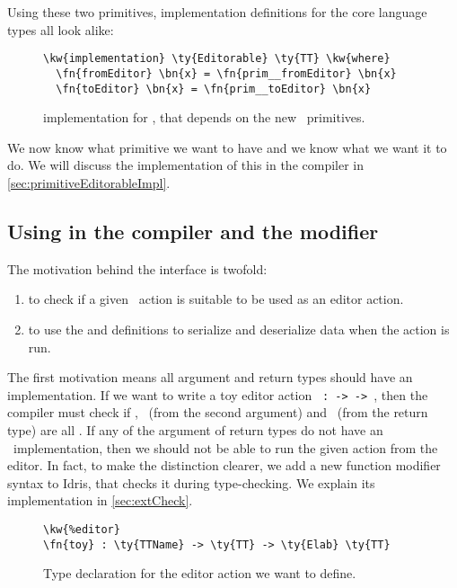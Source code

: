 Using these two primitives,  implementation definitions for the
core language types all look alike:

\begin{figure}[ht]
\caption{ implementation for \TT, that depends on the new \Elab\ primitives.}
\begin{Verbatim}[framesep=2mm, label=\footnotesize{\normalfont{Idris}}, labelposition=topline]
\kw{implementation} \ty{Editorable} \ty{TT} \kw{where}
  \fn{fromEditor} \bn{x} = \fn{prim__fromEditor} \bn{x}
  \fn{toEditor} \bn{x} = \fn{prim__toEditor} \bn{x}
\end{Verbatim}
\end{figure}

We now know what primitive we want to have and we know what we want it to do.
We will discuss the implementation of this in the compiler in
\autoref{sec:primitiveEditorableImpl}.

\subsection{Using  in the compiler and the  modifier}\label{ssec:usingEditorable}

The motivation behind the  interface is twofold:
\begin{enumerate}
\item to check if a given \Elab\ action is suitable to be used as an editor
  action.
\item to use the  and  definitions to serialize
  and deserialize data when the action is run.
\end{enumerate}

The first motivation means all argument and return types should have an
 implementation. If we want to write a toy editor action
\texttt{ :  ->  ->  },
then the compiler must check if , \TT\ (from the second argument)
and \TT\ (from the return type) are all \Editorable. If any of the argument of
return types do not have an \Editorable\ implementation, then we should not be
able to run the given action from the editor. In fact, to make the distinction
clearer, we add a new function modifier syntax  to Idris, that
checks it during type-checking.  We explain its implementation in
\autoref{sec:extCheck}.

\begin{figure}[ht]
\caption{Type declaration for the  editor action we want to define.}
\begin{Verbatim}[framesep=2mm, label=\footnotesize{\normalfont{Idris}}, labelposition=topline]
\kw{%editor}
\fn{toy} : \ty{TTName} -> \ty{TT} -> \ty{Elab} \ty{TT}
\end{Verbatim}
\end{figure}

